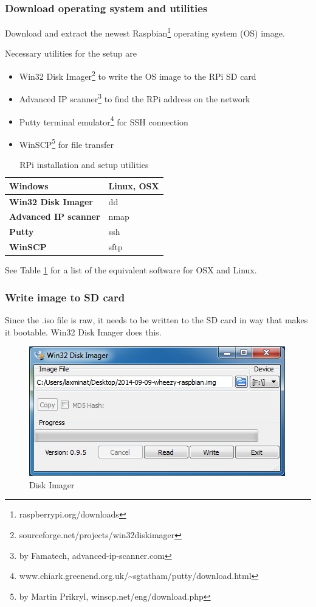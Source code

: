 \documentclass[a4paper,twoside,english]{report}
\providecommand{\tabularnewline}{\\}
\begin{document}
\subsubsection{Download operating system and utilities}

Download and extract the newest Raspbian\footnote{raspberrypi.org/downloads}
operating system (OS) image.

Necessary utilities for the setup are
\begin{itemize}
\item Win32 Disk Imager\footnote{sourceforge.net/projects/win32diskimager}
to write the OS image to the RPi SD card
\item Advanced IP scanner\footnote{by Famatech, advanced-ip-scanner.com}
to find the RPi address on the network 
\item Putty terminal emulator\footnote{www.chiark.greenend.org.uk/\textasciitilde{}sgtatham/putty/download.html}
for SSH connection
\item WinSCP\footnote{by Martin Prikryl, winscp.net/eng/download.php} for
file transfer
\end{itemize}
\begin{table}[h!]
\begin{centering}
\begin{tabular}{>{\bfseries}ll}
\toprule 
Windows & Linux, OSX\tabularnewline
\midrule 
Win32 Disk Imager & dd\tabularnewline
Advanced IP scanner & nmap\tabularnewline
Putty & ssh\tabularnewline
WinSCP & sftp\tabularnewline
\bottomrule
\end{tabular}\caption{RPi installation and setup utilities}
\par\end{centering}
\centering{}\label{tab: RPi utilities} 
\end{table}
See Table \ref{tab: RPi utilities} for a list of the equivalent software
for OSX and Linux.

\subsubsection{Write image to SD card}

Since the .iso file is raw, it needs to be written to the SD card
in way that makes it bootable. Win32 Disk Imager does this.

\begin{figure}[h!]
\centering \includegraphics[scale=0.45]{fig/Rpi_DiskImager} \caption{Disk Imager}

\label{fig: Disk Imager} 
\end{figure}
\end{document}
